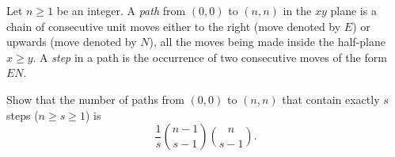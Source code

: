 Let $n \geq 1$ be an integer. A \emph{path} from $(0,0)$ to $(n,n)$ in the $xy$ plane is a chain of consecutive unit moves either to the right (move denoted by $E$) or upwards (move denoted by $N$), all the moves being made inside the half-plane $x \geq y$. A \emph{step} in a path is the occurrence of two consecutive moves of the form $EN$.

Show that the number of paths from $(0,0)$ to $(n,n)$ that contain exactly $s$ steps ($n \geq s \geq 1$) is
\[ \frac{1}{s} \binom{n-1}{s-1} \binom{n}{s-1}. \]
